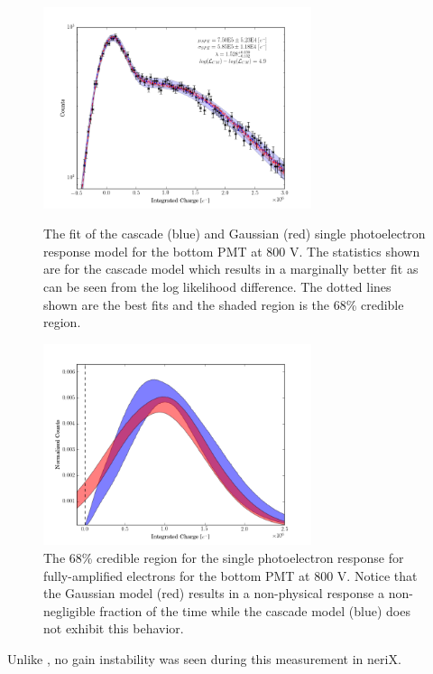 \begin{figure}[p]
	\centering
	\includegraphics[width=0.7\textwidth]{nerix_pmt_best_fit}
	\caption{The fit of the cascade (blue) and Gaussian (red) single photoelectron response model for the bottom PMT at 800 V.  The statistics shown are for the cascade model which results in a marginally better fit as can be seen from the log likelihood difference.  The dotted lines shown are the best fits and the shaded region is the 68\% credible region.}
	\label{fig:nerix_pmt_best_fit}

        \vspace{\floatsep}

	\centering
	\includegraphics[width=0.7\textwidth]{nerix_spe_response}
	\caption{The 68\% credible region for the single photoelectron response for fully-amplified electrons for the bottom PMT at 800 V.  Notice that the Gaussian model (red) results in a non-physical response a non-negligible fraction of the time while the cascade model (blue) does not exhibit this behavior.}
	\label{fig:nerix_spe_response}
\end{figure}


Unlike , no gain instability was seen during this measurement in neriX.  

